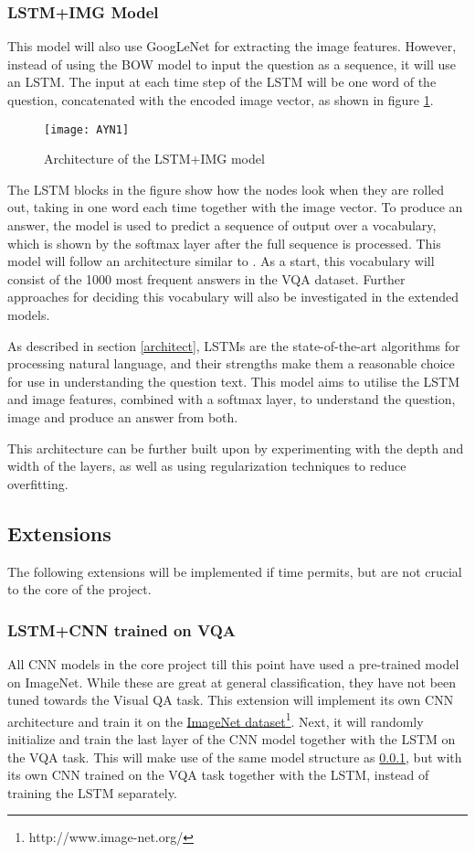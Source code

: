 \documentclass[12pt,a4paper,twoside]{article}
\begin{document}
\subsubsection{LSTM+IMG Model}\label{LSTM+CNNModel}
This model will also use GoogLeNet for extracting the image features. However, instead of using the BOW model to input the question as a sequence, it will use an LSTM. The input at each time step of the LSTM will be one word of the question, concatenated with the encoded image vector, as shown in figure \ref{fig:ayn1}. 
\begin{figure}[h]
\centering
\texttt{[image: AYN1]}
\caption{Architecture of the LSTM+IMG model}
\label{fig:ayn1}
\end{figure}
The LSTM blocks in the figure show how the nodes look when they are rolled out, taking in one word each time together with the image vector. To produce an answer, the model is used to predict a sequence of output over a vocabulary, which is shown by the softmax layer after the full sequence is processed. This model will follow an architecture similar to \cite{CNNLSTM}. As a start, this vocabulary will consist of the 1000 most frequent answers in the VQA dataset. Further approaches for deciding this vocabulary will also be investigated in the extended models.

As described in section \ref{architect}, LSTMs are the state-of-the-art algorithms for processing natural language, and their strengths make them a reasonable choice for use in understanding the question text. This model aims to utilise the LSTM and image features, combined with a softmax layer, to understand the question, image and produce an answer from both.

This architecture can be further built upon by experimenting with the depth and width of the layers, as well as using regularization techniques to reduce overfitting.

\subsection{Extensions}\label{extensions}
The following extensions will be implemented if time permits, but are not crucial to the core of the project. 
\subsubsection{LSTM+CNN trained on VQA}\label{CNNonVQA}
All CNN models in the core project till this point have used a pre-trained model on ImageNet. While these are great at general classification, they have not been tuned towards the Visual QA task. This extension will implement its own CNN architecture and train it on the \href{http://www.image-net.org/}{ImageNet dataset}\footnote{http://www.image-net.org/}. Next, it will randomly initialize and train the last layer of the CNN model together with the LSTM on the VQA task. This will make use of the same model structure as \ref{LSTM+CNNModel}, but with its own CNN trained on the VQA task together with the LSTM, instead of training the LSTM separately.
\end{document}
